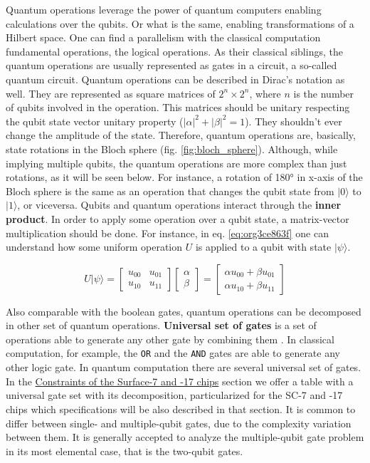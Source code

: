 \begin{itemize}
Quantum operations leverage the power of quantum computers enabling calculations over the qubits.
Or what is the same, enabling transformations of a Hilbert space.
One can find a parallelism with the classical computation fundamental operations, the logical operations.
As their classical siblings, the quantum operations are usually represented as gates in a circuit, a so-called quantum circuit.
Quantum operations can be described in Dirac's notation as well.
They are represented as square matrices of \(2^{n} \times 2^{n}\), where \(n\) is the number of qubits involved in the operation.
This matrices should be unitary respecting the qubit state vector unitary property (\(|\alpha|^2 + |\beta|^2 = 1\)).
They shouldn't ever change the amplitude of the state.
Therefore, quantum operations are, basically, state rotations in the Bloch sphere (fig. \ref{fig:bloch_sphere}).
Although, while implying multiple qubits, the quantum operations are more complex than just rotations, as it will be seen below.
For instance, a rotation of 180° in x-axis of the Bloch sphere is the same as an operation that changes the qubit state from \(| 0 \rangle\) to \(| 1 \rangle\), or viceversa.
Qubits and quantum operations interact through the \textbf{inner product}.
In order to apply some operation over a qubit state, a matrix-vector multiplication should be done.
For instance, in eq. \ref{eq:org3ce863f} one can understand how some uniform operation \(U\) is applied to a qubit with state \(| \psi \rangle\).

\begin{equation}
\label{eq:org3ce863f}
U |\psi\rangle=\begin{bmatrix}u_{00}&u_{01}\\u_{10}&u_{11}\end{bmatrix} \begin{bmatrix}\alpha \\ \beta \end{bmatrix} = \begin{bmatrix}\alpha u_{00} + \beta u_{01} \\ \alpha u_{10} + \beta u_{11} \end{bmatrix}
\end{equation}

Also comparable with the boolean gates, quantum operations can be decomposed in other set of quantum operations.
\textbf{Universal set of gates} is a set of operations able to generate any other gate by combining them \cite{Nielsen_2009}.
In classical computation, for example, the \texttt{OR} and the \texttt{AND} gates are able to generate any other logic gate.
In quantum computation there are several universal set of gates.
In the \href{chapter-3.org}{Constraints of the Surface-7 and -17 chips} section we offer a table with a universal gate set with its decomposition, particularized for the SC-7 and -17 chips which specifications will be also described in that section.
It is common to differ between single- and multiple-qubit gates, due to the complexity variation between them.
It is generally accepted to analyze the multiple-qubit gate problem in its most elemental case, that is the two-qubit gates.


\end{itemize}
